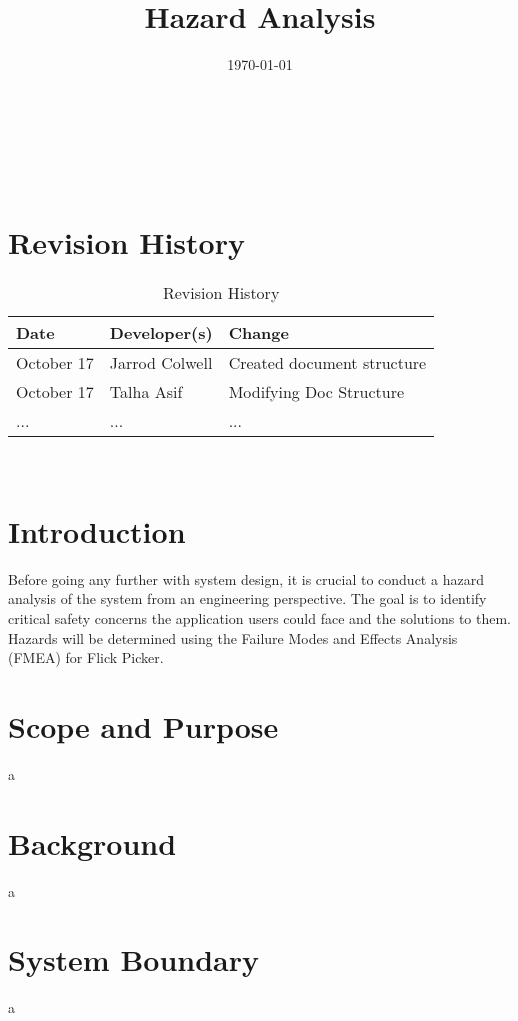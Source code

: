 \documentclass[12pt]{article}
\title{Hazard Analysis\\\progname}
\author{\authname}
\date{\today}
\begin{document}
\maketitle

~\newpage {}

\tableofcontents

~\newpage

\section*{Revision History}
\begin{table}[hp]
	\caption{Revision History} \label{TblRevisionHistory}
	\begin{tabularx}{\textwidth}{llX}
		\toprule
		\textbf{Date} & \textbf{Developer(s)} & \textbf{Change}\\
		\midrule
		October 17 & Jarrod Colwell & Created document structure\\
		October 17 & Talha Asif & Modifying Doc Structure\\
		... & ... & ...\\
		\bottomrule
		\end{tabularx}
\end{table}

~\newpage {}

\section{Introduction}
Before going any further with system design, it is crucial to conduct a hazard analysis of the system from an engineering perspective. The goal is to identify critical safety concerns the application users could face and the solutions to them. Hazards will be determined using the Failure Modes and Effects Analysis (FMEA) for Flick Picker.

\section{Scope and Purpose}
a

\section{Background}
a

\section{System Boundary}
a
\end{document}
